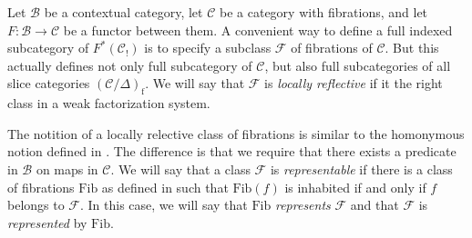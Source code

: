\documentclass[reqno]{amsart}
\theoremstyle{definition}
\theoremstyle{remark}
\newcommand{\fs}[1]{\mathrm{#1}}
\newcommand{\scat}[1]{\mathcal{#1}}
\newcommand{\Fib}{\mathcal{F}}
\numberwithin{figure}{section}
\begin{document}
Let $\scat{B}$ be a contextual category, let $\scat{C}$ be a category with fibrations, and let $F : \scat{B} \to \scat{C}$ be a functor between them.
A convenient way to define a full indexed subcategory of $F^*(\scat{C}_!)$ is to specify a subclass $\Fib$ of fibrations of $\scat{C}$.
But this actually defines not only full subcategory of $\scat{C}$, but also full subcategories of all slice categories $(\scat{C}/\Delta)_\fs{f}$.
We will say that $\Fib$ is \emph{locally reflective} if it the right class in a weak factorization system.

The notition of a locally relective class of fibrations is similar to the homonymous notion defined in \cite[Subsection~10.1]{indexed-tt}.
The difference is that we require that there exists a predicate in $\scat{B}$ on maps in $\scat{C}$.
We will say that a class $\Fib$ is \emph{representable} if there is a class of fibrations $\fs{Fib}$ as defined in \cite[Subsection~9.2]{indexed-tt} such that $\fs{Fib}(f)$ is inhabited if and only if $f$ belongs to $\Fib$.
In this case, we will say that $\fs{Fib}$ \emph{represents} $\Fib$ and that $\Fib$ is \emph{represented} by $\fs{Fib}$.




\end{document}
